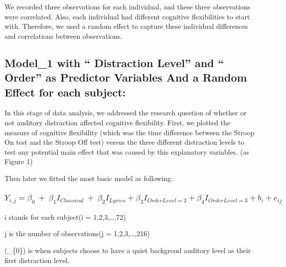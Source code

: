 \documentclass[]{article}
\begin{document}
We recorded three observations for each individual, and these three
observations were correlated. Also, each individual had different
cognitive flexibilities to start with. Therefore, we used a random
effect to capture these individual differences and correlations between
observations.

\hypertarget{model_1-with-distraction-level-and-order-as-predictor-variables-and-a-random-effect-for-each-subject}{%
\subsection{Model\_1 with `` Distraction Level'' and `` Order'' as
Predictor Variables And a Random Effect for each
subject:}\label{model_1-with-distraction-level-and-order-as-predictor-variables-and-a-random-effect-for-each-subject}}

In this stage of data analysis, we addressed the research question of
whether or not auditory distraction affected cognitive flexibility.
First, we plotted the measure of cognitive flexibility (which was the
time difference between the Stroop On test and the Stroop Off test)
versus the three different distraction levels to test any potential main
effect that was caused by this explanatory variables. (as Figure 1)

Then later we fitted the most basic model as following:

\hypertarget{y_ijbeta_0beta_1i_classicalbeta_2i_lyricsbeta_3i_orderlevel2beta_4i_orderlevel3-b_ie_ij}{%
\subsubsection{\texorpdfstring{\(Y_{i,j}=\beta_{0}~+~\beta_1I_{Classical}~+~\beta_2I_{Lyrics}+\beta_3I_{OrderLevel=2}+\beta_4I_{OrderLevel=3}+ b_i+e_{ij}\)}{Y\_\{i,j\}=\textbackslash beta\_\{0\}\textasciitilde+\textasciitilde\textbackslash beta\_1I\_\{Classical\}\textasciitilde+\textasciitilde\textbackslash beta\_2I\_\{Lyrics\}+\textbackslash beta\_3I\_\{OrderLevel=2\}+\textbackslash beta\_4I\_\{OrderLevel=3\}+ b\_i+e\_\{ij\}}}\label{y_ijbeta_0beta_1i_classicalbeta_2i_lyricsbeta_3i_orderlevel2beta_4i_orderlevel3-b_ie_ij}}

i stands for each subject(i = 1,2,3,\ldots,72)

j is the number of observations(j = 1,2,3,\ldots,216)

(\beta\_\{0\}) is when subjects choose to have a quiet backgroud
auditory level as their first distraction level.
\end{document}
